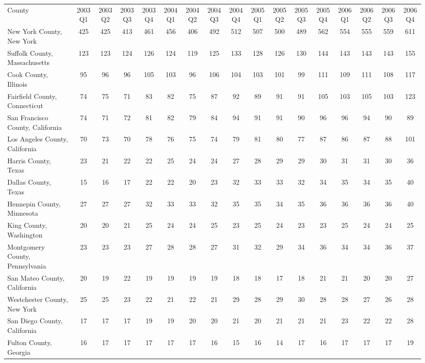 \begin{landscape}
	\begin{longtable}{lcccccccccccccccc}
	\setlength{\tabcolsep}{8pt}
	County &2003Q1 &2003Q2 &2003Q3 &2003Q4 &2004Q1 &2004Q2 &2004Q3 &2004Q4 &2005Q1 & 2005Q2 &2005Q3 &2005Q4 &2006Q1 &2006Q2 &2006Q3 & 2006Q4 \\
		New York County, New York & 425 & 425 & 413 & 461 & 456 & 406 & 492 & 512 & 507 & 500 & 489 & 562 & 554 & 555 & 559 & 611 \\
		Suffolk County, Massachusetts & 123 & 123 & 124 & 126 & 124 & 119 & 125 & 133 & 128 & 126 & 130 & 144 & 143 & 143 & 143 & 155 \\
		Cook County, Illinois & 95 & 96 & 96 & 105 & 103 & 96 & 106 & 104 & 103 & 101 & 99 & 111 & 109 & 111 & 108 & 117 \\
		Fairfield County, Connecticut & 74 & 75 & 71 & 83 & 82 & 75 & 87 & 92 & 89 & 91 & 91 & 105 & 103 & 105 & 103 & 123 \\
		San Francisco County, California & 74 & 71 & 72 & 81 & 82 & 79 & 84 & 94 & 91 & 91 & 90 & 96 & 96 & 94 & 90 & 89 \\
		Los Angeles County, California & 70 & 73 & 70 & 78 & 76 & 75 & 74 & 79 & 81 & 80 & 77 & 87 & 86 & 87 & 88 & 101 \\
		Harris County, Texas & 23 & 21 & 22 & 22 & 25 & 24 & 24 & 27 & 28 & 29 & 29 & 30 & 31 & 31 & 30 & 36 \\
		Dallas County, Texas & 15 & 16 & 17 & 22 & 22 & 20 & 23 & 32 & 33 & 33 & 32 & 34 & 35 & 34 & 35 & 40 \\
		Hennepin County, Minnesota & 27 & 27 & 27 & 32 & 33 & 33 & 32 & 35 & 35 & 34 & 35 & 36 & 36 & 36 & 36 & 40 \\
		King County, Washington & 20 & 20 & 21 & 25 & 24 & 24 & 25 & 23 & 25 & 24 & 23 & 23 & 25 & 24 & 24 & 25 \\
		Montgomery County, Pennsylvania & 23 & 23 & 23 & 27 & 28 & 28 & 27 & 31 & 32 & 29 & 34 & 36 & 34 & 34 & 36 & 37 \\
		San Mateo County, California & 20 & 19 & 22 & 19 & 19 & 19 & 19 & 18 & 18 & 17 & 18 & 21 & 21 & 20 & 20 & 27 \\
		Westchester County, New York & 25 & 25 & 23 & 22 & 21 & 22 & 21 & 29 & 28 & 29 & 30 & 28 & 28 & 27 & 26 & 28 \\
		San Diego County, California & 17 & 17 & 17 & 19 & 19 & 20 & 20 & 21 & 20 & 21 & 21 & 21 & 23 & 22 & 22 & 28 \\
		Fulton County, Georgia & 16 & 17 & 17 & 17 & 17 & 17 & 16 & 15 & 16 & 14 & 17 & 16 & 17 & 17 & 17 & 19 \\

\end{longtable}
\end{landscape}
